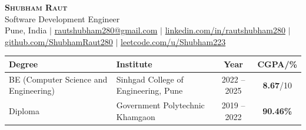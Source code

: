 \documentclass[letterpaper,10pt]{article}
\newcommand{\link}[2]{\href{#1}{\textcolor{accent}{#2}}}
\begin{document}
\begin{center}
  {\Huge \scshape \textbf{Shubham Raut}} \\[3pt]
  {\large Software Development Engineer} \\[3pt]
  \footnotesize
  Pune, India $|$
  \link{mailto:rautshubham280@gmail.com}{rautshubham280@gmail.com} $|$
  \link{https://www.linkedin.com/in/rautshubham280/}{linkedin.com/in/rautshubham280} $|$
  \link{https://github.com/ShubhamRaut280/}{github.com/ShubhamRaut280} $|$
  \link{https://leetcode.com/u/Shubham223/}{leetcode.com/u/Shubham223}
\end{center}
\vspace{-8pt}

{\small
\renewcommand{\arraystretch}{1.1}
\begin{tabularx}{\linewidth}{@{}>{\centering\arraybackslash}X >{\centering\arraybackslash}X c c@{}}
  \hline
  \textbf{Degree} & \textbf{Institute} & \textbf{Year} & \textbf{CGPA/\%} \\
  \hline
  BE (Computer Science and Engineering) & Sinhgad College of Engineering, Pune & 2022 -- 2025 & \textbf{8.67}/10 \\
  Diploma & Government Polytechnic Khamgaon & 2019 -- 2022 & \textbf{90.46\%} \\
  \hline
\end{tabularx}
}
\end{document}
